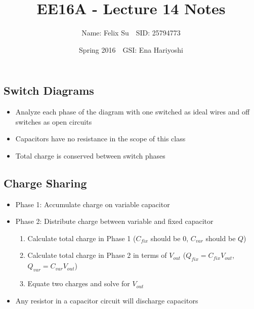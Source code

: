 \documentclass{article}\usepackage{amsmath,amssymb,amsthm,tikz,tkz-graph,color,chngpage,soul,hyperref,csquotes,graphicx,floatrow}\newcommand*{\QEDB}{\hfill\ensuremath{\square}}\newtheorem*{prop}{Proposition}\renewcommand{\theenumi}{\alph{enumi}}\usepackage[shortlabels]{enumitem}\usepackage[nobreak=true]{mdframed}\usetikzlibrary{matrix,calc}\MakeOuterQuote{"}\usepackage[margin=0.75in]{geometry} \newtheorem{theorem}{Theorem}
\title{EE16A - Lecture 14 Notes}
\author{Name: Felix Su$\quad$SID: 25794773}
\date{Spring 2016$\quad$GSI: Ena Hariyoshi}
\begin{document}
\maketitle

\subsection*{Switch Diagrams}
\begin{itemize}
    \item Analyze each phase of the diagram with one switched as ideal wires and off switches as open circuits
    \item Capacitors have no resistance in the scope of this class
    \item Total charge is conserved between switch phases
\end{itemize}
\subsection*{Charge Sharing}
\begin{itemize}
    \item Phase 1: Accumulate charge on variable capacitor
    \item Phase 2: Distribute charge between variable and fixed capacitor
    \begin{enumerate}
        \item Calculate total charge in Phase 1 ($C_{fix}$ should be 0, $C_{var}$ should be $Q$)
        \item Calculate total charge in Phase 2 in terms of $V_{out}$ ($Q_{fix} = C_{fix}V_{out}$, $Q_{var} = C_{var}V_{out}$)
        \item Equate two charges and solve for $V_{out}$
    \end{enumerate}
    \item Any resistor in a capacitor circuit will discharge capacitors
\end{itemize}
\end{document}
